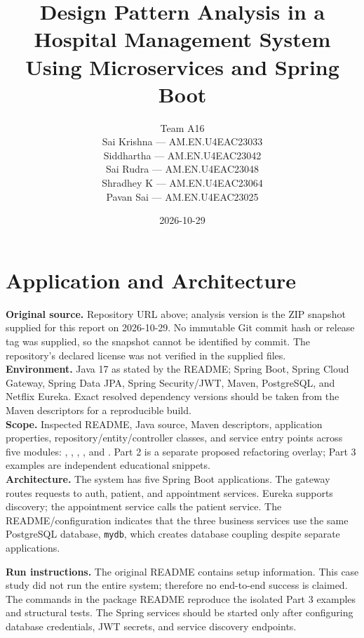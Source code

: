 \documentclass[11pt,a4paper]{article}
\title{\textbf{Design Pattern Analysis in a Hospital Management System Using Microservices and Spring Boot}}
\author{Team A16\\[2mm]
Sai Krishna --- AM.EN.U4EAC23033\\
Siddhartha --- AM.EN.U4EAC23042\\
Sai Rudra --- AM.EN.U4EAC23048\\
Shradhey K --- AM.EN.U4EAC23064\\
Pavan Sai --- AM.EN.U4EAC23025}
\date{2026-10-29}
\begin{document}
\maketitle
\tableofcontents
\newpage

\section{Application and Architecture}
\textbf{Original source.} Repository URL above; analysis version is the ZIP snapshot supplied for this report on 2026-10-29. No immutable Git commit hash or release tag was supplied, so the snapshot cannot be identified by commit. The repository's declared license was not verified in the supplied files.\\
\textbf{Environment.} Java 17 as stated by the README; Spring Boot, Spring Cloud Gateway, Spring Data JPA, Spring Security/JWT, Maven, PostgreSQL, and Netflix Eureka. Exact resolved dependency versions should be taken from the Maven descriptors for a reproducible build.\\
\textbf{Scope.} Inspected README, Java source, Maven descriptors, application properties, repository/entity/controller classes, and service entry points across five modules: , , , , and . Part 2 is a separate proposed refactoring overlay; Part 3 examples are independent educational snippets.\\
\textbf{Architecture.} The system has five Spring Boot applications. The gateway routes requests to auth, patient, and appointment services. Eureka supports discovery; the appointment service calls the patient service. The README/configuration indicates that the three business services use the same PostgreSQL database, \texttt{mydb}, which creates database coupling despite separate applications.

\begin{center}
\end{center}
\textbf{Run instructions.} The original README contains setup information. This case study did not run the entire system; therefore no end-to-end success is claimed. The commands in the package README reproduce the isolated Part 3 examples and structural tests. The Spring services should be started only after configuring database credentials, JWT secrets, and service discovery endpoints.
\end{document}
